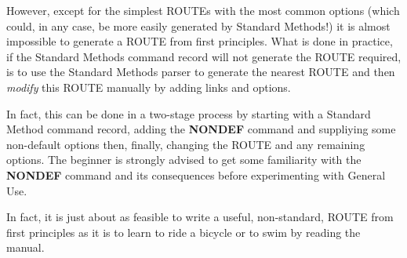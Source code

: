 However, except for the simplest ROUTEs with the most common options
(which could, in any case, be more easily generated by Standard Methods!)
it is almost impossible to generate a ROUTE from first principles.
What is done in practice, if the Standard Methods command record will
not generate the ROUTE required, is to use the Standard Methods
parser to generate the nearest ROUTE  and then {\em modify} this ROUTE
manually by adding links and options.

In fact, this can be done in a two-stage process by starting
with a Standard Method command record, adding the {\bf NONDEF}
command and suppliying some non-default options then, finally,
changing the ROUTE and any remaining options. The beginner
is strongly advised to get some familiarity with the {\bf NONDEF}
command and its consequences before experimenting with General Use.

In fact, it is just about as feasible
to write a useful, non-standard, ROUTE from first principles 
as it is to learn to ride a bicycle or
to swim by  reading the manual.

